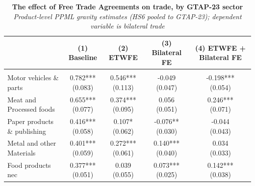 \begin{table}[t]
\caption*{
{\fontsize{20}{25}\selectfont  \textbf{The effect of Free Trade Agreements on trade, by GTAP-23 sector}\fontsize{10}{12}\selectfont } \\ 
{\fontsize{14}{17}\selectfont  \emph{Product-level PPML gravity estimates (HS6 pooled to GTAP-23); dependent variable is bilateral trade}\fontsize{10}{12}\selectfont }
} 
\fontsize{10.0pt}{12.0pt}\selectfont
\begin{tabular*}{\linewidth}{@{\extracolsep{\fill}}l|cccc}
\toprule
 & {\bfseries (1) Baseline} & {\bfseries (2) ETWFE} & {\bfseries (3) Bilateral FE} & {\bfseries (4) ETWFE + Bilateral FE} \\ 
\midrule\addlinespace[2.5pt]
\multicolumn{5}{l}{{\itshape \bfseries A. FTA effect by GTAP-23 sector}} \\[2.5pt] 
\midrule\addlinespace[2.5pt]
Motor vehicles \& parts & \shortstack[l]{0.782*** \\(0.083)} & \shortstack[l]{0.546*** \\(0.113)} & \shortstack[l]{-0.049 \\(0.047)} & \shortstack[l]{-0.198*** \\(0.054)} \\ 
Meat and Processed foods & \shortstack[l]{0.655*** \\(0.077)} & \shortstack[l]{0.374*** \\(0.095)} & \shortstack[l]{0.056 \\(0.051)} & \shortstack[l]{0.246*** \\(0.071)} \\ 
Paper products \& publishing & \shortstack[l]{0.416*** \\(0.058)} & \shortstack[l]{0.107* \\(0.062)} & \shortstack[l]{-0.076** \\(0.030)} & \shortstack[l]{-0.044 \\(0.043)} \\ 
Metal and other Materials & \shortstack[l]{0.401*** \\(0.059)} & \shortstack[l]{0.272*** \\(0.061)} & \shortstack[l]{0.140*** \\(0.040)} & \shortstack[l]{0.034 \\(0.033)} \\ 
Food products nec & \shortstack[l]{0.377*** \\(0.051)} & \shortstack[l]{0.039 \\(0.055)} & \shortstack[l]{0.073*** \\(0.025)} & \shortstack[l]{0.142*** \\(0.038)} \\ 

\end{tabular*}
\end{table}
